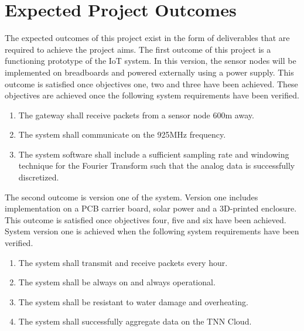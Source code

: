 \section{Expected Project Outcomes}

The expected outcomes of this project exist in the form of deliverables that are required to achieve the project aims. The first outcome of this project is a functioning prototype of the IoT system. In this version, the sensor nodes will be implemented on breadboards and powered externally using a power supply. This outcome is satisfied once objectives one, two and three have been achieved. These objectives are achieved once the following system requirements have been verified. 
\begin{enumerate}
\item The gateway shall receive packets from a sensor node 600m away.
\item The system shall communicate on the 925MHz frequency.
\item The system software shall include a sufficient sampling rate and windowing technique for the Fourier Transform such that the analog data is successfully discretized. 
\end{enumerate}

The second outcome is version one of the system. Version one includes implementation on a PCB carrier board, solar power and a 3D-printed enclosure. This outcome is satisfied once objectives four, five and six have been achieved. System version one is achieved when the following system requirements have been verified. 
\begin{enumerate}
\item The system shall transmit and receive packets every hour. 
\item The system shall be always on and always operational. 
\item The system shall be resistant to water damage and overheating. 
\item The system shall successfully aggregate data on the TNN Cloud.
\end{enumerate}











